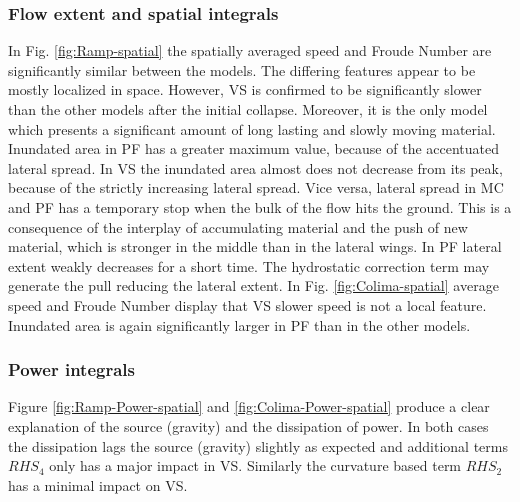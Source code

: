 \documentclass{article}
\begin{document}
\subsubsection{Flow extent and spatial integrals}
In Fig. \ref{fig:Ramp-spatial} the spatially averaged speed and Froude Number are significantly similar between the models. The differing features appear to be mostly localized in space. However, VS is confirmed to be significantly slower than the other models after the initial collapse. Moreover, it is the only model which presents a significant amount of long lasting and slowly moving material. Inundated area in PF has a greater maximum value, because of the accentuated lateral spread. In VS the inundated area almost does not decrease from its peak, because of the strictly increasing lateral spread. Vice versa, lateral spread in MC and PF has a temporary stop when the bulk of the flow hits the ground. This is a consequence of the interplay of accumulating material and the push of new material, which is stronger in the middle than in the lateral wings. In PF lateral extent weakly decreases for a short time. The hydrostatic correction term may generate the pull reducing the lateral extent. In Fig. \ref{fig:Colima-spatial} average speed and Froude Number display that VS slower speed is not a local feature. Inundated area is again significantly larger in PF than in the other models.

\subsubsection{Power integrals}
Figure \ref{fig:Ramp-Power-spatial}  and \ref{fig:Colima-Power-spatial} produce a clear explanation of the source (gravity) and the dissipation of power.  In both cases the dissipation lags the source (gravity) slightly as expected and additional terms $RHS_4$ only has a major impact in VS. Similarly the curvature based term $RHS_2$ has a minimal impact on VS.
\end{document}
